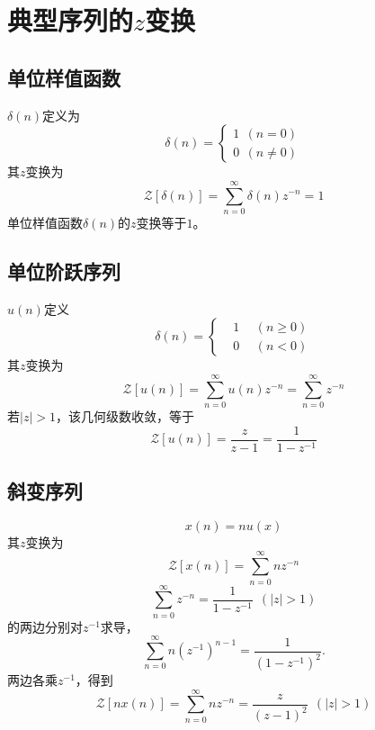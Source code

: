\documentclass[12pt,a4paper]{article}
\begin{document}
\section{典型序列的$z$变换}
\subsection{单位样值函数}
$\delta(n)$定义为
\begin{equation}
\delta(n) = \left\{ 
\begin{aligned}
1 ~~(n = 0) \\
0 ~~(n \neq 0)
\end{aligned}
\right.
\end{equation}
其$z$变换为
\begin{equation*}
\mathscr{Z}[\delta(n)] = \sum_{n=0}^{\infty} \delta(n) z^{-n} = 1
\end{equation*}
单位样值函数$\delta(n)$的$z$变换等于$1$。


\subsection{单位阶跃序列}
$u(n)$定义
\begin{equation}
\delta(n) = \left\{ 
\begin{aligned}
&1 ~~&(n \geqslant 0) \\
&0 ~~&(n < 0)
\end{aligned}
\right.
\end{equation}
其$z$变换为
\begin{equation*}
\mathscr{Z}[u(n)] = \sum_{n=0}^{\infty} u(n) z^{-n} = \sum_{n=0}^{\infty} z^{-n}
\end{equation*}
若$|z| > 1$，该几何级数收敛，等于
\begin{equation}
\mathscr{Z}[u(n)] = \frac{z}{z-1} = \frac{1}{1-z^{-1}}
\end{equation}

\subsection{斜变序列}
\begin{equation}
x(n) = n u(x)
\end{equation}
其$z$变换为
\begin{equation}
\mathscr{Z}[x(n)] = \sum_{n=0}^{\infty} n z^{-n}
\end{equation}
\begin{equation*}
\sum_{n=0}^{\infty} z^{-n} = \frac{1}{1-z^{-1}}  ~~(|z| > 1)
\end{equation*}
的两边分别对$z^{-1}$求导，
\begin{equation*}
\sum_{n=0}^{\infty} n (z^{-1})^{n-1} = \frac{1}{(1-z^{-1})^2} .
\end{equation*}
两边各乘$z^{-1}$，得到
\begin{equation}
\mathscr{Z}[n x(n)] = \sum_{n=0}^{\infty} n z^{-n} = \frac{z}{(z-1)^2}  ~~(|z| > 1)
\end{equation}
\end{document}
